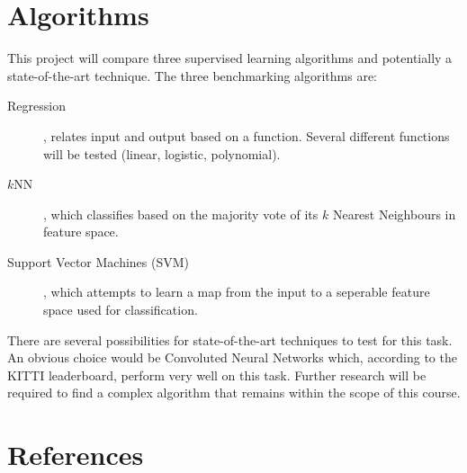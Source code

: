 \documentclass[a4paper,10pt]{article}
\begin{document}
\section{Algorithms}
This project will compare three supervised learning algorithms and potentially a state-of-the-art technique. The three benchmarking algorithms are:
\begin{description}
 \item[Regression], relates input and output based on a function. Several different functions will be tested (linear, logistic, polynomial).
 \item[$k$NN], which classifies based on the majority vote of its $k$ Nearest Neighbours in feature space.
 \item[Support Vector Machines (SVM)], which attempts to learn a map from the input to a seperable feature space used for classification.
\end{description}

There are several possibilities for state-of-the-art techniques to test for this task. An obvious choice would be Convoluted Neural Networks which, according to the KITTI leaderboard, perform very well on this task\cite{}. Further research will be required to find a complex algorithm that remains within the scope of this course.

\section{References}
\end{document}
